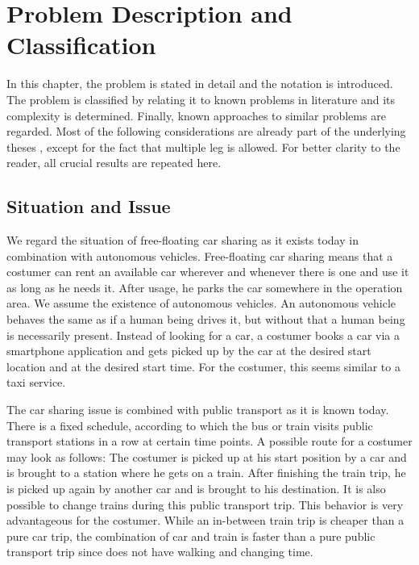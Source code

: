 \chapter{Problem Description and Classification}

In this chapter, the problem is stated in detail and the notation is introduced. The problem is classified by relating it to known problems in literature and its complexity is determined. Finally, known approaches to similar problems are regarded. Most of the following considerations are already part of the underlying theses \cite{Kaiser_Knoll}, except for the fact that multiple leg is allowed. For better clarity to the reader, all crucial results are repeated here.

\section{Situation and Issue}

We regard the situation of free-floating car sharing as it exists today in combination with autonomous vehicles. Free-floating car sharing means that a costumer can rent an available car wherever and whenever there is one and use it as long as he needs it. After usage, he parks the car somewhere in the operation area. We assume the existence of autonomous vehicles. An autonomous vehicle behaves the same as if a human being drives it, but without that a human being is necessarily present. Instead of looking for a car, a costumer books a car via a smartphone application and gets picked up by the car at the desired start location and at the desired start time. For the costumer, this seems similar to a taxi service. 

The car sharing issue is combined with public transport as it is known today. There is a fixed schedule, according to which the bus or train visits public transport stations in a row at certain time points. A possible route for a costumer may look as follows: The costumer is picked up at his start position by a car and is brought to a station where he gets on a train. After finishing the train trip, he is picked up again by another car and is brought to his destination. It is also possible to change trains during this public transport trip. This behavior is very advantageous for the costumer. While an in-between train trip is cheaper than a pure car trip, the combination of car and train is faster than a pure public transport trip since does not have walking and changing time.


